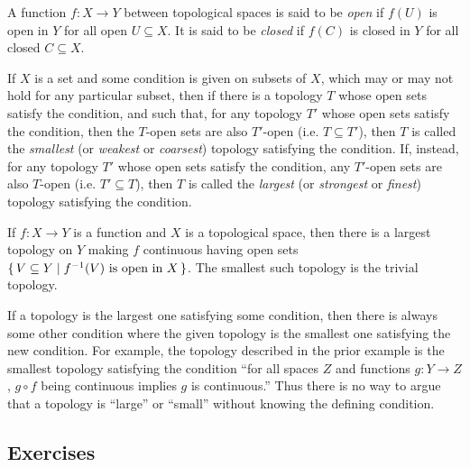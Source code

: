 \documentclass[letterpaper, 11pt]{article}
\begin{document}
\begin{defn}
  A function $f\colon X \to Y$ between topological spaces is said to be \emph{open} if $f(U)$ is open in $Y$ for all open $U \subseteq X$.
  It is said to be \emph{closed} if $f(C)$ is closed in $Y$ for all closed $C \subseteq X$.
\end{defn}

\clearpage

\begin{defn}
  If $X$ is a set and some condition is given on subsets of $X$, which may or may not hold for any particular subset, then if there is a topology $T$ whose open sets satisfy the condition, and such that, for any topology $T'$ whose open sets satisfy the condition, then the $T$-open sets are also $T'$-open (i.e. $T \subseteq T'$), then $T$ is called the \emph{smallest} (or \emph{weakest} or \emph{coarsest}) topology satisfying the condition.
  If, instead, for any topology $T'$ whose open sets satisfy the condition, any $T'$-open sets are also $T$-open (i.e. $T' \subseteq T$), then $T$ is called the \emph{largest} (or \emph{strongest} or \emph{finest}) topology satisfying the condition.
\end{defn}

\begin{ex}
  If $f\colon X \to Y$ is a function and $X$ is a topological space, then there is a largest topology on $Y$ making $f$ continuous having open sets $\set{V \subseteq Y | f^{-1}(V) \text{ is open in } X}$.
  The smallest such topology is the trivial topology.
\end{ex}

If a topology is the largest one satisfying some condition, then there is always some other condition where the given topology is the smallest one satisfying the new condition.
For example, the topology described in the prior example is the smallest topology satisfying the condition ``for all spaces $Z$ and functions $g\colon Y \to Z$, $g \circ f$ being continuous implies $g$ is continuous.''
Thus there is no way to argue that a topology is ``large'' or ``small'' without knowing the defining condition.

\clearpage

\subsection{Exercises}
\end{document}
